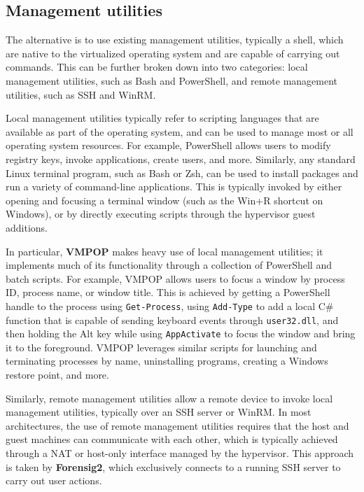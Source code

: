 \subsection{Management utilities}\label{management-utilities}

The alternative is to use existing management utilities, typically a
shell, which are native to the virtualized operating system and are
capable of carrying out commands. This can be further broken down into
two categories: local management utilities, such as Bash and PowerShell,
and remote management utilities, such as SSH and WinRM.

Local management utilities typically refer to scripting languages that
are available as part of the operating system, and can be used to manage
most or all operating system resources. For example, PowerShell allows
users to modify registry keys, invoke applications, create users, and
more. Similarly, any standard Linux terminal program, such as Bash or
Zsh, can be used to install packages and run a variety of command-line
applications. This is typically invoked by either opening and focusing a
terminal window (such as the Win+R shortcut on Windows), or by directly
executing scripts through the hypervisor guest additions.

In particular, \textbf{VMPOP} makes heavy use of local management
utilities; it implements much of its functionality through a collection
of PowerShell and batch scripts. For example, VMPOP allows users to
focus a window by process ID, process name, or window title. This is
achieved by getting a PowerShell handle to the process using
\passthrough{\lstinline!Get-Process!}, using
\passthrough{\lstinline!Add-Type!} to add a local C\# function that is
capable of sending keyboard events through
\passthrough{\lstinline!user32.dll!}, and then holding the Alt key while
using \passthrough{\lstinline!AppActivate!} to focus the window and
bring it to the foreground. VMPOP leverages similar scripts for
launching and terminating processes by name, uninstalling programs,
creating a Windows restore point, and more.

Similarly, remote management utilities allow a remote device to invoke
local management utilities, typically over an SSH server or WinRM. In
most architectures, the use of remote management utilities requires that
the host and guest machines can communicate with each other, which is
typically achieved through a NAT or host-only interface managed by the
hypervisor. This approach is taken by \textbf{Forensig2}, which
exclusively connects to a running SSH server to carry out user actions.

